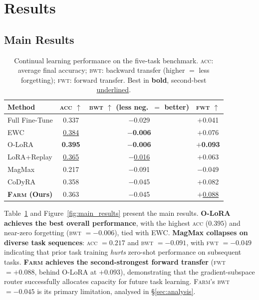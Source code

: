 \documentclass{article}
\newcommand{\FARM}{\textsc{Farm}}
\newcommand{\ACC}{\textsc{acc}}
\newcommand{\BWT}{\textsc{bwt}}
\newcommand{\FWT}{\textsc{fwt}}
\begin{document}
\section{Results}
\label{sec:results}

\subsection{Main Results}

\begin{table}[t]
\centering
\caption{Continual learning performance on the five-task benchmark. \ACC: average final accuracy; \BWT: backward transfer (higher $=$ less forgetting); \FWT: forward transfer. Best in \textbf{bold}, second-best \underline{underlined}.}
\label{tab:main}
\begin{tabular}{lccc}
\toprule
\textbf{Method} & \textbf{\ACC} $\uparrow$ & \textbf{\BWT} $\uparrow$ (less neg.~$=$ better) & \textbf{\FWT} $\uparrow$ \\
\midrule
Full Fine-Tune              & 0.337          & $-$0.029          & $+$0.041 \\
EWC \citep{kirkpatrick2017overcoming} & \underline{0.384} & \textbf{$-$0.006} & $+$0.076 \\
O-LoRA \citep{wang2023orthogonal}     & \textbf{0.395} & \textbf{$-$0.006} & \textbf{$+$0.093} \\
LoRA+Replay                 & \underline{0.365} & \underline{$-$0.016} & $+$0.063 \\
MagMax \citep{marczak2024magmax}      & 0.217          & $-$0.091          & $-$0.049 \\
CoDyRA \citep{zhang2024codyre}        & 0.358          & $-$0.045          & $+$0.082 \\
\midrule
\textbf{\FARM{} (Ours)}     & 0.363          & $-$0.045          & \underline{$+$0.088} \\
\bottomrule
\end{tabular}
\end{table}

Table~\ref{tab:main} and Figure~\ref{fig:main_results} present the main results. \textbf{O-LoRA achieves the best overall performance}, with the highest \ACC{} ($0.395$) and near-zero forgetting (\BWT{} $= -0.006$), tied with EWC. \textbf{MagMax collapses on diverse task sequences}: \ACC{} $= 0.217$ and \BWT{} $= -0.091$, with \FWT{} $= -0.049$ indicating that prior task training \emph{hurts} zero-shot performance on subsequent tasks. \textbf{\FARM{} achieves the second-strongest forward transfer} (\FWT{} $= +0.088$, behind O-LoRA at $+0.093$), demonstrating that the gradient-subspace router successfully allocates capacity for future task learning. \FARM{}'s \BWT{} $= -0.045$ is its primary limitation, analysed in \S\ref{sec:analysis}.
\end{document}
